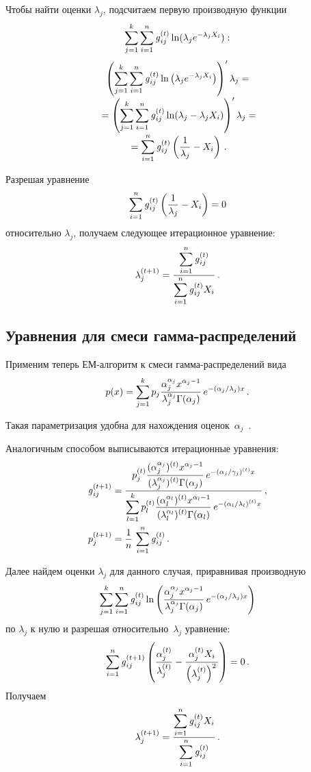 \begin{multicols}{2}
Чтобы найти  оценки $\lambda_j$, подсчитаем первую производную функции
$$\sum_{j=1}^k\sum_{i=1}^n \mbox{\textit{g}}_{ij}^{(t)} \ln (\lambda_j e^{-\lambda_j X_i}):$$
\vspace*{-8pt}
\begin{multline*}
\left ( \sum\limits_{j=1}^k \sum\limits_{i=1}^n
\mbox{\textit{g}}_{ij}^{(t)}\ln \left ( \lambda_j
e^{-\lambda_j X_i} \right ) \right )^\prime \lambda_j =\\[-3pt]
{}= \left (
\sum\limits_{j=1}^k\sum\limits_{i=1}^n \mbox{\textit{g}}_{ij}^{(t)}\ln (\lambda_j -\lambda_j X_i )
\right )^\prime \lambda_j =\\[-3pt]
{}= \sum\limits_{i=1}^n \mbox{\textit{g}}_{ij}^{(t)}\left (
\displaystyle\frac{\displaystyle 1\mathstrut}{\displaystyle \lambda_j\mathstrut} - X_i \right )\,.
\end{multline*}

Разрешая уравнение
$$
\sum\limits_{i=1}^n \mbox{\textit{g}}_{ij}^{(t)}\left ( \displaystyle\frac{\displaystyle 1\mathstrut}{\displaystyle \lambda_j\mathstrut} -X_i\right ) =0
$$
относительно $\lambda_j$, получаем следующее итерационное уравнение:
$$
\lambda_j^{(t+1)} = \displaystyle\frac{\displaystyle \sum\limits_{i=1}^n
\mbox{\textit{g}}_{ij}^{(t)}\mathstrut}{\displaystyle \sum\limits_{i=1}^n \mbox{\textit{g}}_{ij}^{(t)} X_i\mathstrut}\,.
$$

\subsection{Уравнения для смеси гамма-распределений } %

Применим теперь ЕМ-алгоритм к смеси гам\-ма-рас\-пре\-де\-ле\-ний вида
$$
p(x) = \sum\limits_{j=1}^k p_j \displaystyle\frac{\displaystyle \alpha_j^{\alpha_j} x^{\alpha_j -
1}\mathstrut}{\displaystyle \lambda_j^{\alpha_j} \Gamma (\alpha_j )\mathstrut}\,e^{-(\alpha_j / \lambda_j)x}\,.
$$

Такая параметризация удобна для нахождения
оценок~$\alpha_j$~\cite{6bat}.

Аналогичным способом выписываются итерационные уравнения:
\begin{align*}
\mbox{\textit{g}}_{ij}^{(t+1)} & =   \displaystyle\frac{\displaystyle p_j^{(t)}\displaystyle\frac{\displaystyle (\alpha_j^{\alpha_j} )^{(t)}
x^{\alpha_j - 1}\mathstrut}{\displaystyle (\lambda_j^{\alpha_j} )^{(t)}\Gamma (\alpha_j)\mathstrut}\,
e^{-(\alpha_j /\gamma_j)^{(t)}x}\mathstrut}{\displaystyle \sum\limits_{l=1}^k
p_l^{(t)}\displaystyle\frac{\displaystyle (\alpha_l^{\alpha_l})^{(t)} x^{\alpha_l -
1}\mathstrut}{\displaystyle (\lambda_l^{\alpha_l})^{(t)}\Gamma (\alpha_l )\mathstrut}\,
e^{-(\alpha_l /\lambda_l)^{(t)} x}\mathstrut}\,,\\
p_j^{(t+1)} & = \displaystyle\frac{\displaystyle 1\mathstrut}{\displaystyle n\mathstrut}\,\sum\limits_{i=1}^n \mbox{\textit{g}}_{ij}^{(t)}\,.
\end{align*}

Далее найдем оценки $\lambda_j$ для данного случая, приравнивая
производную
\begin{equation} %
\sum\limits_{j=1}^k \sum\limits_{i=1}^n \g_{ij}^{(t)} \ln \left (
\fr{\alpha_j^{\alpha_j} x^{\alpha_j -1}}{\lambda_j^{\alpha_j}\Gamma
(\alpha_j)}\,e^{-(\alpha_j /\lambda_j) x}\right )
\end{equation}
по $\lambda_j$ к нулю и разрешая относительно~$\lambda_j$ уравнение:
$$
\sum\limits_{i=1}^n \mbox{\textit{g}}_{ij}^{(t+1)}\left ( \displaystyle\frac{\displaystyle \alpha_j^{(t)}\mathstrut}{\displaystyle \lambda_j^{(t)}\mathstrut}
- \displaystyle\frac{\displaystyle \alpha_j^{(t)}X_i\mathstrut}{\displaystyle \left ( \lambda_j^{(t)}\right )^2\mathstrut}\right ) =0 \,.
$$
Получаем
$$
\lambda_j^{(t+1)} = \displaystyle\frac{\displaystyle \sum\limits_{i=1}^n \mbox{\textit{g}}_{ij}^{(t)}
X_i\mathstrut}{\displaystyle \sum\limits_{i=1}^n \mbox{\textit{g}}_{ij}^{(t)}\mathstrut}\,.
$$


\end{multicols}
